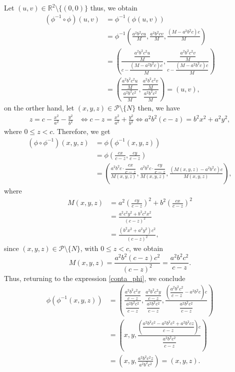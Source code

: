 \documentclass{amsart}
\theoremstyle{plain}
\numberwithin{equation}{section}
\begin{document}
\noindent Let $(u,v) \in \mathbb{R}^2 \setminus \{(0,0)\}$ thus, we obtain
\begin{align*}
	(\phi^{-1} \circ \phi)(u,v) &= \phi^{-1}(\phi(u,v)) \\
	&= \phi^{-1} \left( \frac{a^2b^2cu}{M}, \frac{a^2b^2cv}{M}, \frac{(M - a^2b^2c)c}{M} \right) \\
	&= \left( \frac{\dfrac{a^2b^2c^2u}{M}}{c - \dfrac{(M - a^2b^2c)c}{M}}, \frac{\dfrac{a^2b^2c^2v}{M}}{c - \dfrac{(M - a^2b^2c)c}{M}} \right) \\
	&= \left( \frac{\dfrac{a^2b^2c^2u}{M}}{\dfrac{a^2b^2c^2}{M}}, \frac{\dfrac{a^2b^2c^2v}{M}}{\dfrac{a^2b^2c^2}{M}} \right) = (u, v),
\end{align*}
\noindent on the orther hand, let $(x,y,z) \in \mathcal{P} \setminus \{N\}$ then, we have
\begin{align*}
	z = c - \frac{x^2}{a^2} - \frac{y^2}{b^2} 
	&\Longleftrightarrow c - z = \frac{x^2}{a^2} + \frac{y^2}{b^2} \Longleftrightarrow a^2b^2(c - z) = b^2x^2 + a^2y^2,
\end{align*}
where $0 \leq z < c$. Therefore, we get
\begin{align}\label{conta_phi}
	(\phi \circ \phi^{-1} )(x,y,z) &= \phi(\phi^{-1}(x,y,z)) \nonumber \\
	&= \phi \left( \frac{cx}{c - z}, \frac{cy}{c - z} \right) \\
	&= \left( \frac{a^2b^2c \cdot \dfrac{cx}{c - z}}{M(x,y,z)}, \frac{a^2b^2c \cdot \dfrac{cy}{c - z}}{M(x,y,z)}, \frac{(M(x,y,z) - a^2b^2c)c}{M(x,y,z)} \right), \nonumber
\end{align}
where
\begin{align*}
	M(x,y,z) &= a^2\left( \frac{cy}{c - z} \right)^2 + b^2\left( \frac{cx}{c - z} \right)^2 \\
	&= \frac{a^2c^2y^2 + b^2c^2x^2}{(c - z)^2} \\
	&= \frac{(b^2x^2 + a^2y^2)c^2}{(c - z)^2},
\end{align*}
since $(x, y, z) \in \mathcal{P} \setminus \{N\}$, with $0 \leq z < c$, we obtain
\[
M(x,y,z) = \frac{a^2b^2(c - z)c^2}{(c - z)^2} = \frac{a^2b^2c^2}{c - z}.
\]
\noindent Thus, returning to the expression \eqref{conta_phi}, we conclude
\begin{align*}
	\phi(\phi^{-1}(x,y,z)) 
	&= \left( \frac{ \dfrac{a^2b^2c^2x}{c - z} }{ \dfrac{a^2b^2c^2}{c - z} }, \frac{ \dfrac{a^2b^2c^2y}{c - z} }{ \dfrac{a^2b^2c^2}{c - z} }, \frac{ \left( \dfrac{a^2b^2c^2}{c - z} - a^2b^2c \right) c }{ \dfrac{a^2b^2c^2}{c - z} } \right) \\
	&= \left( x, y, \frac{ \left( \dfrac{a^2b^2c^2 - a^2b^2c^2 + a^2b^2cz}{c - z} \right) c }{ \dfrac{a^2b^2c^2}{c - z} } \right) \\
	&= \left( x, y, \frac{a^2b^2c^2z}{a^2b^2c^2} \right) = (x, y, z).
\end{align*}
\end{document}
